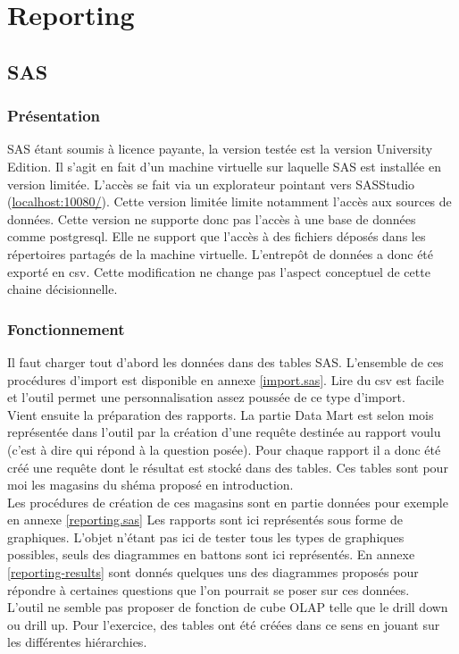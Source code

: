 
\chapter{Reporting}
\section{SAS}
\subsection{Présentation}
SAS étant soumis à licence payante, la version testée est la version University Edition. Il s'agit en fait d'un machine virtuelle sur laquelle SAS est installée en version limitée. L'accès se fait via un explorateur pointant vers SASStudio (\url{localhost:10080/}). Cette version limitée limite notamment l'accès aux sources de données. Cette version ne supporte donc pas l'accès à une base de données comme postgresql. Elle ne support que l'accès à des fichiers déposés dans les répertoires partagés de la machine virtuelle. L'entrepôt de données a donc été exporté en csv. Cette modification ne change pas l'aspect conceptuel de cette chaine décisionnelle.
\subsection{Fonctionnement}
Il faut charger tout d'abord les données dans des tables SAS. L'ensemble de ces procédures d'import est disponible en annexe \ref{import.sas}. Lire du csv est facile et l'outil permet une personnalisation assez poussée de ce type d'import.\\
Vient ensuite la préparation des rapports. La partie Data Mart est selon mois représentée dans l'outil par la création d'une requête destinée au rapport voulu (c'est à dire qui répond à la question posée). Pour chaque rapport il a donc été créé une requête dont le résultat est stocké dans des tables. Ces tables sont pour moi les magasins du shéma proposé en introduction.\\ 
Les procédures de création de ces magasins sont en partie données pour exemple en annexe \ref{reporting.sas}
Les rapports sont ici représentés sous forme de graphiques. L'objet n'étant pas ici de tester tous les types de graphiques possibles, seuls des diagrammes en battons sont ici représentés. En annexe \ref{reporting-results} sont donnés quelques uns des diagrammes proposés pour répondre à certaines questions que l'on pourrait se poser sur ces données.\\
L'outil ne semble pas proposer de fonction de cube OLAP telle que le drill down ou drill up. Pour l'exercice, des tables ont été créées dans ce sens en jouant sur les différentes hiérarchies.

